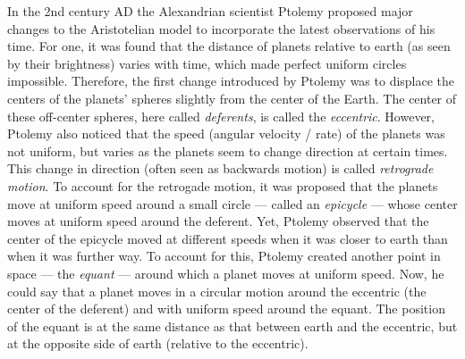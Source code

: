 
In the 2nd century AD the Alexandrian scientist Ptolemy proposed major changes to the Aristotelian model to incorporate the latest observations of his time. For one, it was found that the distance of planets relative to earth (as seen by their brightness) varies with time, which made perfect uniform circles impossible. Therefore, the first change introduced by Ptolemy was to displace the centers of the planets' spheres slightly from the center of the Earth. The center of these off-center spheres, here called \emph{deferents}, is called the \emph{eccentric}. However, Ptolemy also noticed that the speed (angular velocity / rate) of the planets was not uniform, but varies as the planets seem to change direction at certain times. This change in direction (often seen as backwards motion) is called \emph{retrograde motion}. To account for the retrogade motion, it was proposed that the planets move at uniform speed around a small circle --- called an \emph{epicycle} --- whose center moves at uniform speed around the deferent. Yet, Ptolemy observed that the center of the epicycle moved at different speeds when it was closer to earth than when it was further way. To account for this, Ptolemy created another point in space --- the \emph{equant} --- around which a planet moves at uniform speed. Now, he could say that a planet moves in a circular motion around the eccentric (the center of the deferent) and with uniform speed around the equant. The position of the equant is at the same distance as that between earth and the eccentric, but at the opposite side of earth (relative to the eccentric).

